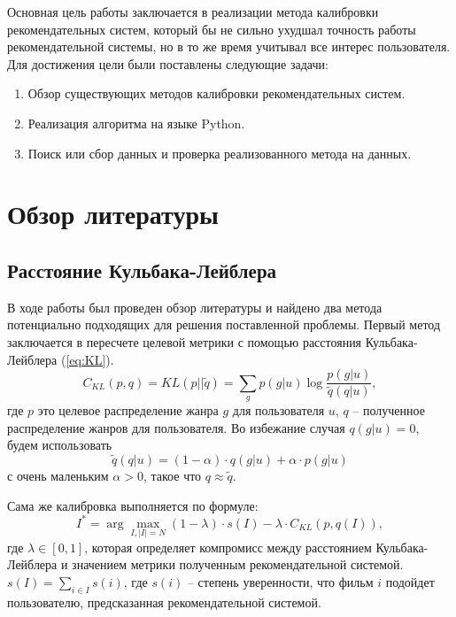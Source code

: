 \documentclass[a4paper,article,14pt]{extarticle}
\begin{document}
Основная цель работы заключается в реализации метода калибровки рекомендательных систем, который бы не сильно ухудшал точность работы рекомендательной системы, но в то же время учитывал все интерес пользователя.
\\

Для достижения цели были поставлены следующие задачи:
\begin{enumerate} 
    \item Обзор существующих методов калибровки рекомендательных систем.
    \item Реализация алгоритма на языке Python.
    \item Поиск или сбор данных и проверка реализованного метода на данных.
  \end{enumerate}
  
\pagebreak
\section{Обзор литературы}
\subsection{Расстояние Кульбака-Лейблера}
В ходе работы был проведен обзор литературы и найдено два метода потенциально подходящих для решения поставленной проблемы. Первый метод заключается в пересчете целевой метрики с помощью расстояния Кульбака-Лейблера (\ref{eq:KL}). \cite{voc1}
\begin{equation}
  C_{KL}(p,q) = KL(p||\tilde{q}) = \sum_g p(g|u)\log\frac{p(g|u)}{\tilde{q}(q|u)},
  \label{eq:KL}
\end{equation}
где ${p}$ это целевое распределение жанра ${g}$ для пользователя $u$, $q$ -- полученное распределение жанров для пользователя.
Во избежание случая $q(g|u)=0$, будем использовать 
\begin{equation}
  \tilde{q}(q|u) = (1-\alpha) \cdot q(g|u) + \alpha \cdot p(g|u)
\end{equation} с очень маленьким $\alpha>0$, такое что $q\approx\tilde{q}$.

Сама же калибровка выполняется по формуле: 
\begin{equation}
  \label{eq:Calibrated}
  I^*=\arg \max_{I, |I|=N} (1-\lambda) \cdot s(I) - \lambda \cdot C_{KL}(p,q(I)),
\end{equation} где $\lambda \in [0,1]$, которая определяет компромисс между расстоянием Кульбака-Лейблера и значением метрики полученным рекомендательной системой. $s(I)=\sum_{i\in I}s(i)$, где $s(i)$ -- степень уверенности, что фильм $i$ подойдет пользователю, предсказанная рекомендательной системой.
\end{document}
